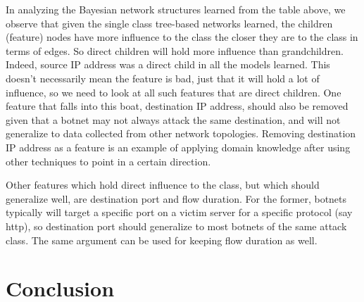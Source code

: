 \documentclass[letterpaper]{article}
\begin{document}
In analyzing the Bayesian network structures learned from the table above, we observe that given the single class tree-based networks learned, the children (feature) nodes have more influence to the class the closer they are to the class in terms of edges.  So direct children will hold more influence than grandchildren.  Indeed, source IP address was a direct child in all the models learned.  This doesn't necessarily mean the feature is bad, just that it will hold a lot of influence, so we need to look at all such features that are direct children.  One feature that falls into this boat, destination IP address, should also be removed given that a botnet may not always attack the same destination, and will not generalize to data collected from other network topologies. Removing destination IP address as a feature is an example of applying domain knowledge after using other techniques to point in a certain direction.

Other features which hold direct influence to the class, but which should generalize well, are destination port and flow duration. For the former, botnets typically will target a specific port on a victim server for a specific protocol (say http), so destination port should generalize to most botnets of the same attack class.  The same argument can be used for keeping flow duration as well.

\section{Conclusion}



\end{document}
